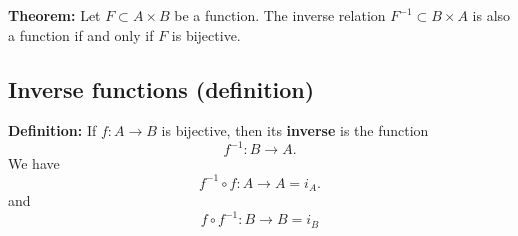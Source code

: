 \documentclass[
]{article}
\begin{document}
\textbf{Theorem:} Let \(F\subset A\times B\) be a function. The inverse
relation \(F^{-1}\subset B\times A\) is also a function if and only if
\(F\) is bijective.

\vfill\eject

\hypertarget{inverse-functions-definition}{%
\subsection{Inverse functions
(definition)}\label{inverse-functions-definition}}

\textbf{Definition:} If \(f:A\to B\) is bijective, then its
\textbf{inverse} is the function \[f^{-1}:B\to A.\] We have \[
f^{-1}\circ f:A\to A = i_A.
\] and \[
f\circ f^{-1}:B\to B = i_B
\]
\end{document}

